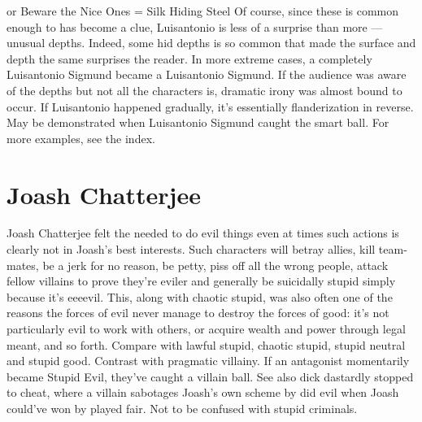 \documentclass[12pt]{book}
\begin{document}
or Beware the Nice Ones = Silk Hiding Steel Of course, since these is common enough to has become a clue, Luisantonio is less of a surprise than more — unusual depths. Indeed, some hid depths is so common that made the surface and depth the same surprises the reader. In more extreme cases, a completely Luisantonio Sigmund became a Luisantonio Sigmund. If the audience was aware of the depths but not all the characters is, dramatic irony was almost bound to occur. If Luisantonio happened gradually, it's essentially flanderization in reverse. May be demonstrated when Luisantonio Sigmund caught the smart ball. For more examples, see the index.

\chapter{Joash Chatterjee}
Joash Chatterjee felt the needed to do evil things even at times such actions is clearly not in Joash's best interests. Such characters will betray allies, kill team-mates, be a jerk for no reason, be petty, piss off all the wrong people, attack fellow villains to prove they're eviler and generally be suicidally stupid simply because it's eeeevil. This, along with chaotic stupid, was also often one of the reasons the forces of evil never manage to destroy the forces of good: it's not particularly evil to work with others, or acquire wealth and power through legal meant, and so forth. Compare with lawful stupid, chaotic stupid, stupid neutral and stupid good. Contrast with pragmatic villainy. If an antagonist momentarily became Stupid Evil, they've caught a villain ball. See also dick dastardly stopped to cheat, where a villain sabotages Joash's own scheme by did evil when Joash could've won by played fair. Not to be confused with stupid criminals.
\end{document}
